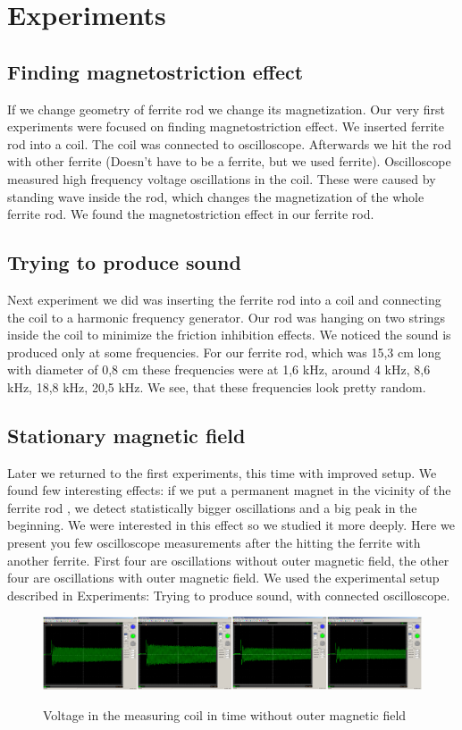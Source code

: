 \documentclass[10pt,a4paper]{article}
\begin{document}
\newpage
\section{Experiments}
\subsection{Finding magnetostriction effect}
If we change geometry of ferrite rod we change its magnetization. Our very first experiments were focused on finding magnetostriction effect. We inserted ferrite rod into a coil. The coil was connected to oscilloscope. Afterwards we hit the rod with other ferrite (Doesn’t have to  be a ferrite, but we used ferrite). Oscilloscope measured high frequency voltage oscillations in the coil. These were caused by standing wave inside the rod, which changes the magnetization of the whole ferrite rod. We found the magnetostriction effect in our ferrite rod.
\subsection{Trying to produce sound}
Next experiment we did was inserting the ferrite rod into a coil and connecting the coil to a harmonic frequency generator. Our rod was hanging on two strings inside the coil to minimize the friction inhibition effects. We noticed the sound is produced only at some frequencies. For our ferrite rod, which was 15,3 cm long with diameter of 0,8 cm these frequencies were at 1,6 kHz, around 4 kHz, 8,6 kHz, 18,8 kHz, 20,5 kHz. We see, that these frequencies look pretty random.
\subsection{Stationary  magnetic field}
Later we returned to the first experiments, this time with improved setup. We found few interesting effects: if we put a permanent magnet in the vicinity of the ferrite rod , we detect statistically bigger oscillations and a big peak in the beginning. We were interested in this effect so we studied it more deeply. Here we present you few oscilloscope measurements after the hitting the ferrite with another ferrite. First four are oscillations without outer magnetic field, the other four are oscillations with outer magnetic field. We used the experimental setup described in Experiments: Trying to produce sound, with connected oscilloscope.

\begin{figure}[H]
\centering
    \includegraphics[width=\textwidth]{bezf.png}
    \label{fig:uvod}
    \caption{Voltage in the measuring coil in time without outer magnetic field}
\end{figure}
\end{document}
